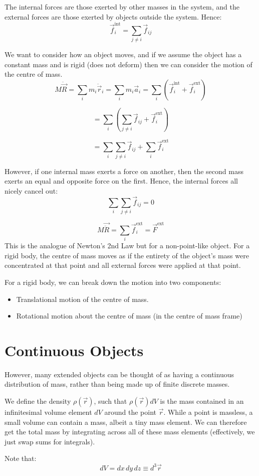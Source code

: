 The internal forces are those exerted by other masses in the system, and the external forces are those exerted by objects outside the system. Hence:
\[
\vec{f}_i^\text{int} = \sum_{j \neq i} \vec{f}_{ij}
\]

We want to consider how an object moves, and if we assume the object has a constant mass and is rigid (does not deform) then we can consider the motion of the centre of mass.
\[
M \ddot{\vec{R}} = \sum_i m_i \ddot{\vec{r}}_i = \sum_i m_i \vec{a}_i = \sum_i \left(\vec{f}_i^\text{int} + \vec{f}_i^\text{ext}\right)
\]

\[
= \sum_i \left( \sum_{j \neq i} \vec{f}_{ij} + \vec{f}_i^\text{ext} \right)
\]

\[
= \sum_i \sum_{j \neq i} \vec{f}_{ij} + \sum_i \vec{f}_i^\text{ext}
\]

However, if one internal mass exerts a force on another, then the second mass exerts an equal and opposite force on the first. Hence, the internal forces all nicely cancel out:
\[
\sum_i \sum_{j \neq i} \vec{f}_{ij} = 0
\]

\[
M \vec{\ddot{R}} = \sum_i \vec{f}_i^\text{ext} = \vec{F}^\text{ext}
\]
This is the analogue of Newton's 2nd Law but for a non-point-like object. For a rigid body, the centre of mass moves as if the entirety of the object's mass were concentrated at that point and all external forces were applied at that point.

For a rigid body, we can break down the motion into two components:
\begin{itemize}
    \item Translational motion of the centre of mass.
    \item Rotational motion about the centre of mass (in the centre of mass frame)
\end{itemize}

\section{Continuous Objects}
However, many extended objects can be thought of as having a continuous distribution of mass, rather than being made up of finite discrete masses. 

We define the density $\rho(\vec{r})$, such that $\rho(\vec{r}) dV$ is the mass contained in an infinitesimal volume element $dV$ around the point $\vec{r}$. While a point is massless, a small volume can contain a mass, albeit a tiny mass element. We can therefore get the total mass by integrating across all of these mass elements (effectively, we just swap sums for integrals).

Note that:
\[
    dV = dx \, dy \, dz \equiv d^3 \vec{r}
\]
